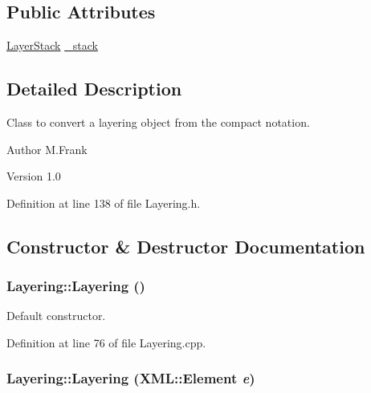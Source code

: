 \subsection*{Public Attributes}
\begin{DoxyCompactItemize}
\item 
\hyperlink{class_d_d4hep_1_1_layer_stack}{LayerStack} \hyperlink{class_d_d4hep_1_1_layering_a3abc06c9a003b7e5cb163660652a6318}{\_\-stack}
\end{DoxyCompactItemize}


\subsection{Detailed Description}
Class to convert a layering object from the compact notation. \begin{DoxyAuthor}{Author}
M.Frank 
\end{DoxyAuthor}
\begin{DoxyVersion}{Version}
1.0 
\end{DoxyVersion}


Definition at line 138 of file Layering.h.

\subsection{Constructor \& Destructor Documentation}
\hypertarget{class_d_d4hep_1_1_layering_aece09b62f4026ce23f6077fb677458ea}{
\subsubsection[{Layering}]{\setlength{\rightskip}{0pt plus 5cm}Layering::Layering ()}}
\label{class_d_d4hep_1_1_layering_aece09b62f4026ce23f6077fb677458ea}


Default constructor. 

Definition at line 76 of file Layering.cpp.\hypertarget{class_d_d4hep_1_1_layering_a0184f98f114c11134ac13ae521400dcc}{
\subsubsection[{Layering}]{\setlength{\rightskip}{0pt plus 5cm}Layering::Layering ({\bf XML::Element} {\em e})}}
\label{class_d_d4hep_1_1_layering_a0184f98f114c11134ac13ae521400dcc}


